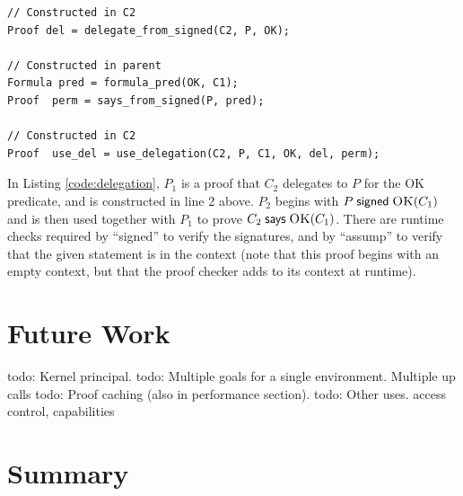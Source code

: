 \documentclass[10pt]{article}
\newcommand{\sign}[2]{\ensuremath{#1\;\textsf{signed}\;#2}}
\newcommand{\says}[2]{\ensuremath{#1\;\textsf{says}\;#2}}
\newcommand{\pred}[2]{\ensuremath{\textsc{#1}(#2)}}
\newcommand{\todo}[1]{{\color{red}todo: {#1}}}
\begin{document}
\begin{lstlisting}
// Constructed in C2
Proof del = delegate_from_signed(C2, P, OK);  

// Constructed in parent
Formula pred = formula_pred(OK, C1);
Proof  perm = says_from_signed(P, pred);

// Constructed in C2
Proof  use_del = use_delegation(C2, P, C1, OK, del, perm);
\end{lstlisting}
In Listing \ref{code:delegation}, $P_1$ is a proof that $C_2$ delegates to $P$ for the OK predicate, and is constructed in line 2 above.  $P_2$ begins with $\sign{P}{\pred{OK}{C_1}}$ and is then used together with $P_1$ to prove $\says{C_2}{\pred{OK}{C_1}}$.  There are runtime checks required by ``signed'' to verify the signatures, and by ``assump'' to verify that the given statement is in the context (note that this proof begins with an empty context, but that the proof checker adds to its context at runtime).  

\section{Future Work}
\todo{Kernel principal.}\newline
\todo{Multiple goals for a single environment. Multiple up calls}\newline
\todo{Proof caching (also in performance section).}\newline
\todo{Other uses. access control, capabilities}\newline

\section{Summary}
\end{document}
